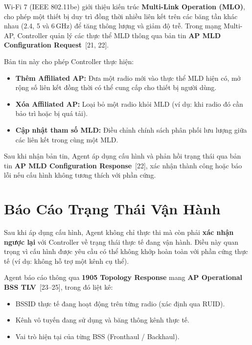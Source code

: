 Wi-Fi 7 (IEEE 802.11be) giới thiệu kiến trúc \textbf{Multi-Link Operation (MLO)}, cho
phép một thiết bị duy trì đồng thời nhiều liên kết trên các băng tần khác nhau (2.4, 5
và 6\,GHz) để tăng thông lượng và giảm độ trễ. Trong mạng Multi-AP, Controller quản lý
các thực thể MLD thông qua bản tin \textbf{AP MLD Configuration Request}~[21, 22].

Bản tin này cho phép Controller thực hiện:
\begin{itemize}
	\item \textbf{Thêm Affiliated AP:} Đưa một radio mới vào thực thể MLD hiện có,
	mở rộng số liên kết đồng thời có thể cung cấp cho thiết bị người dùng.
	\item \textbf{Xóa Affiliated AP:} Loại bỏ một radio khỏi MLD (ví dụ: khi radio
	đó cần bảo trì hoặc bị quá tải).
	\item \textbf{Cập nhật tham số MLD:} Điều chỉnh chính sách phân phối lưu lượng
	giữa các liên kết trong cùng một MLD.
\end{itemize}

Sau khi nhận bản tin, Agent áp dụng cấu hình và phản hồi trạng thái qua bản tin
\textbf{AP MLD Configuration Response}~[22], xác nhận thành công hoặc báo lỗi
nếu cấu hình không tương thích với phần cứng.


\section{Báo Cáo Trạng Thái Vận Hành}

Sau khi áp dụng cấu hình, Agent không chỉ thực thi mà còn phải \textbf{xác nhận
	ngược lại} với Controller về trạng thái thực tế đang vận hành. Điều này quan trọng
vì cấu hình được yêu cầu có thể không khớp hoàn toàn với phần cứng thực tế
(ví dụ: không hỗ trợ một kênh cụ thể).

Agent báo cáo thông qua \textbf{1905 Topology Response} mang \textbf{AP Operational
	BSS TLV}~[23--25], trong đó liệt kê:
\begin{itemize}
	\item BSSID thực tế đang hoạt động trên từng radio (xác định qua RUID).
	\item Kênh vô tuyến đang sử dụng và băng thông kênh thực tế.
	\item Vai trò hiện tại của từng BSS (Fronthaul / Backhaul).
\end{itemize}


